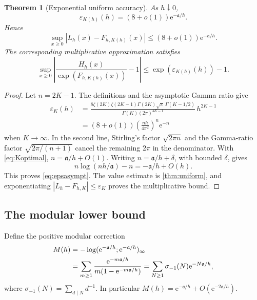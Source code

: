 \documentclass[11pt,a4paper]{article}
\numberwithin{equation}{section}
\newtheorem{theorem}{Theorem}[section]
\theoremstyle{definition}
\newcommand{\ee}{\mathrm e}
\newcommand{\Act}{\mathfrak a}
\newcommand{\eps}{\varepsilon}
\begin{document}
\begin{theorem}[Exponential uniform accuracy]
\label{thm:optimal}
As $h\downarrow0$,
\begin{equation}
\eps_{K(h)}(h)=(8+o(1))\ee^{-\Act/h}.
\label{eq:epsasympt}
\end{equation}
Hence
\begin{equation}
\sup_{x\ge0}|L_h(x)-F_{h,K(h)}(x)|
 \le(8+o(1))\ee^{-\Act/h}.
\label{eq:optimaluniform}
\end{equation}
The corresponding multiplicative approximation satisfies
\[
\sup_{x\ge0}\left|\frac{H_h(x)}{\exp(F_{h,K(h)}(x))}-1\right|
 \le\exp(\eps_{K(h)}(h))-1.
\]
\end{theorem}
\begin{proof}
Let $n=2K-1$. The definitions and the asymptotic Gamma ratio give
\begin{align*}
\eps_K(h)
&=\frac{8\zeta(2K)\zeta(2K-1)\Gamma(2K)\sqrt\pi\,
             \Gamma(K-1/2)}
 {\Gamma(K)(2\pi)^{4K-1}}\,h^{2K-1}\\
&=(8+o(1))\left(\frac{nh}{4\pi^2}\right)^n\ee^{-n}
\end{align*}
when $K\to\infty$. In the second line, Stirling's factor $\sqrt{2\pi n}$ and the Gamma-ratio factor $\sqrt{2\pi/(n+1)}$ cancel the remaining $2\pi$ in the denominator. With \eqref{eq:Koptimal}, $n=\Act/h+O(1)$. Writing $n=\Act/h+\delta$, with bounded $\delta$, gives
\[
n\log(nh/\Act)-n=-\Act/h+O(h).
\]
This proves \eqref{eq:epsasympt}. The value estimate is \cref{thm:uniform}, and exponentiating $|L_h-F_{h,K}|\le\eps_K$ proves the multiplicative bound.
\end{proof}

\subsection{The modular lower bound}
Define the positive modular correction
\begin{align}
M(h)&=-\log(\ee^{-\Act/h};\ee^{-\Act/h})_\infty\label{eq:M}\\
&=\sum_{m\ge1}\frac{\ee^{-m\Act/h}}{m(1-\ee^{-m\Act/h})}
 =\sum_{N\ge1}\sigma_{-1}(N)\ee^{-N\Act/h},\notag
\end{align}
where $\sigma_{-1}(N)=\sum_{d\mid N}d^{-1}$. In particular
$M(h)=\ee^{-\Act/h}+O(\ee^{-2\Act/h})$.
\end{document}
